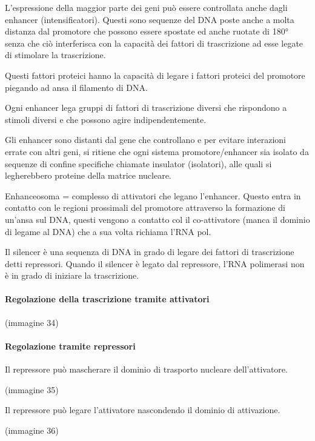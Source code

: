 \documentclass[]{article}
\begin{document}
L'espressione della maggior parte dei geni può essere controllata anche
dagli enhancer (intensificatori). Questi sono sequenze del DNA poste
anche a molta distanza dal promotore che possono essere spostate ed
anche ruotate di 180° senza che ciò interferisca con la capacità dei
fattori di trascrizione ad esse legate di stimolare la trascrizione.

Questi fattori proteici hanno la capacità di legare i fattori proteici
del promotore piegando ad ansa il filamento di DNA.

Ogni enhancer lega gruppi di fattori di trascrizione diversi che
rispondono a stimoli diversi e che possono agire indipendentemente.

Gli enhancer sono distanti dal gene che controllano e per evitare
interazioni errate con altri geni, si ritiene che ogni sistema
promotore/enhancer sia isolato da sequenze di confine specifiche
chiamate insulator (isolatori), alle quali si legherebbero proteine
della matrice nucleare.

Enhanceosoma = complesso di attivatori che legano l'enhancer. Questo
entra in contatto con le regioni prossimali del promotore attraverso la
formazione di un'ansa sul DNA, questi vengono a contatto col il
co-attivatore (manca il dominio di legame al DNA) che a sua volta
richiama l'RNA pol.

Il silencer è una sequenza di DNA in grado di legare dei fattori di
trascrizione detti repressori. Quando il silencer è legato dal
repressore, l'RNA polimerasi non è in grado di iniziare la trascrizione.

\paragraph{Regolazione della trascrizione tramite
attivatori}\label{regolazione-della-trascrizione-tramite-attivatori}

(immagine 34)

\paragraph{Regolazione tramite
repressori}\label{regolazione-tramite-repressori}

Il repressore può mascherare il dominio di trasporto nucleare
dell'attivatore.

(immagine 35)

Il repressore può legare l'attivatore nascondendo il dominio di
attivazione.

(immagine 36)
\end{document}
